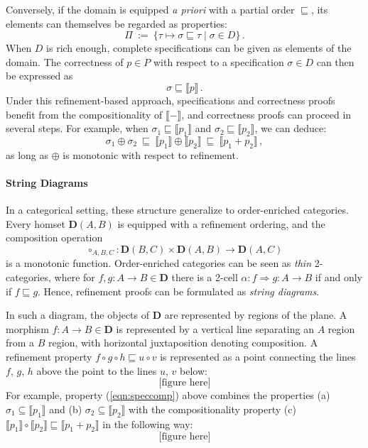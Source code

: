 \documentclass[sigplan,10pt,review,anonymous]{acmart}
\begin{document}
Conversely,
if the domain is equipped \emph{a priori}
with a partial order $\sqsubseteq$,
its elements can themselves be regarded as properties:
\[
  \Pi \: := \:
    \{ \tau \mapsto \sigma \sqsubseteq \tau \mid
       \sigma \in D \}
  \,.
\]
When $D$ is rich enough,
complete specifications
can be given as elements of the domain.
The correctness of $p \in P$
with respect to a specification $\sigma \in D$
can then be expressed as
\[
  \sigma \sqsubseteq \llbracket p \rrbracket
  \,.
\]
Under this refinement-based approach,
specifications and correctness proofs
benefit from the compositionality of $\llbracket - \rrbracket$,
and correctness proofs can proceed in several steps.
For example,
when $\sigma_1 \sqsubseteq \llbracket p_1 \rrbracket$
and $\sigma_2 \sqsubseteq \llbracket p_2 \rrbracket$,
we can deduce:
\begin{equation} \label{eqn:speccomp}
  \sigma_1 \oplus \sigma_2 \:\sqsubseteq\:
  \llbracket p_1 \rrbracket \oplus
  \llbracket p_2 \rrbracket \:\sqsubseteq\:
  \llbracket p_1 + p_2 \rrbracket
  \,,
\end{equation}
as long as $\oplus$ is monotonic
with respect to refinement.

\paragraph{String Diagrams}

In a categorical setting,
these structure generalize to
order-enriched categories.
Every homset $\mathbf{D}(A, B)$
is equipped with a refinement ordering,
and the composition operation
\[
  {\circ}_{A,B,C} :
    \mathbf{D}(B, C) \times \mathbf{D}(A, B) \rightarrow
    \mathbf{D}(A, C)
\]
is a monotonic function.
Order-enriched categories can be seen as
\emph{thin} 2-categories,
where for $f, g : A \rightarrow B \in \mathbf{D}$
there is a 2-cell
$\alpha : f \Rightarrow g : A \rightarrow B$
if and only if $f \sqsubseteq g$.
Hence,
refinement proofs can be formulated as
\emph{string diagrams}.

In such a diagram,
the objects of $\mathbf{D}$ are represented by regions of the plane.
A morphism $f : A \rightarrow B \in \mathbf{D}$
is represented by a vertical line
separating an $A$ region from a $B$ region,
with horizontal juxtaposition denoting composition.
A refinement property
$f \circ g \circ h \sqsubseteq u \circ v$
is represented as a point
connecting the lines $f$, $g$, $h$ above the point
to the lines $u$, $v$ below:
\[
  \text{[figure here]}
\]
For example,
property (\ref{eqn:speccomp}) above
combines the properties
(a) $\sigma_1 \subseteq \llbracket p_1 \rrbracket$ and
(b) $\sigma_2 \subseteq \llbracket p_2 \rrbracket$ with
the compositionality property
(c) $\llbracket p_1 \rrbracket \circ \llbracket p_2 \rrbracket
     \sqsubseteq \llbracket p_1 + p_2 \rrbracket$
in the following way:
\[
  \text{[figure here]}
\]
\end{document}
